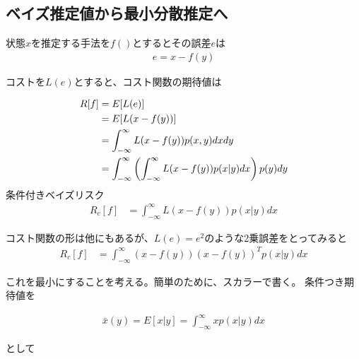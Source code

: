 \subsection{ベイズ推定値から最小分散推定へ}
状態$x$を推定する手法を$f()$とするとその誤差$e$は
\begin{align}
e = x-f(y)
\end{align}

コストを$L(e)$とすると、コスト関数の期待値は

\begin{align}
R[f] 
&=E[L(e)] 		\notag\\
&=E[L(x-f(y))] 			\notag\\
&= \int_{-\infty}^\infty
    L(x-f(y)) p(x,y)dxdy	 			 \notag\\
&=\int_{-\infty}^\infty 
    \left( \int_{-\infty}^\infty
    L(x-f(y)) p(x|y)dx		 			
	\right) p(y)dy
\end{align}
%
条件付きベイズリスク
\begin{align}
R_c[f] 
&=\int_{-\infty}^\infty
    L(x-f(y)) p(x|y)dx		
\end{align}

コスト関数の形は他にもあるが、$L(e)=e^2$のような2乗誤差をとってみると
%
\begin{align}
R_c[f] 
&=\int_{-\infty}^\infty
    (x-f(y))(x-f(y))^T p(x|y)dx		 			
\end{align}

これを最小にすることを考える。簡単のために、スカラーで書く。
条件つき期待値を

\begin{align}
\bar{x}(y) = E[x|y]=\int_{-\infty}^\infty x p(x|y)dx		
\end{align}

として

